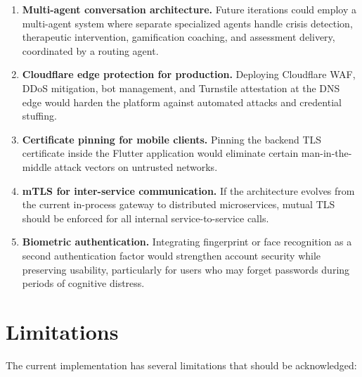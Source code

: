 \documentclass[12pt,a4paper,oneside,openany]{report}
\begin{document}
\begin{enumerate}[nosep]
\item \textbf{Multi-agent conversation architecture.} Future iterations could employ a multi-agent system where separate specialized agents handle crisis detection, therapeutic intervention, gamification coaching, and assessment delivery, coordinated by a routing agent.
\item \textbf{Cloudflare edge protection for production.} Deploying Cloudflare WAF, DDoS mitigation, bot management, and Turnstile attestation at the DNS edge would harden the platform against automated attacks and credential stuffing.
\item \textbf{Certificate pinning for mobile clients.} Pinning the backend TLS certificate inside the Flutter application would eliminate certain man-in-the-middle attack vectors on untrusted networks.
\item \textbf{mTLS for inter-service communication.} If the architecture evolves from the current in-process gateway to distributed microservices, mutual TLS should be enforced for all internal service-to-service calls.
\item \textbf{Biometric authentication.} Integrating fingerprint or face recognition as a second authentication factor would strengthen account security while preserving usability, particularly for users who may forget passwords during periods of cognitive distress.
\end{enumerate}

\section{Limitations}

The current implementation has several limitations that should be acknowledged:
\end{document}
